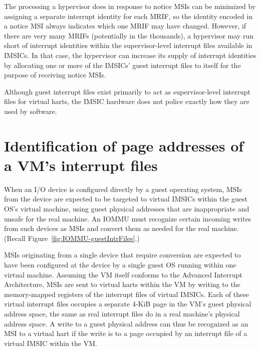 The processing a hypervisor does in response to notice MSIs can be
minimized by assigning a separate interrupt identity for each MRIF, so
the identity encoded in a notice MSI always indicates which one MRIF
may have changed.
However, if there are very many MRIFs (potentially in the thousands),
a hypervisor may run short of interrupt identities within the
supervisor-level interrupt files available in IMSICs.
In that case, the hypervisor can increase its supply of interrupt
identities by allocating one or more of the IMSICs' guest interrupt
files to itself for the purpose of receiving notice MSIs.

\begin{commentary}
Although guest interrupt files exist primarily to act as
supervisor-level interrupt files for virtual harts, the IMSIC hardware
does not police exactly how they are used by software.
\end{commentary}

\section{Identification of page addresses of a VM's interrupt files}
\label{sec:IOMMU-identIncomingMSIs}

When an I/O device is configured directly by a guest operating system,
MSIs from the device are expected to be targeted to virtual IMSICs
within the guest OS's virtual machine, using guest physical addresses
that are inappropriate and unsafe for the real machine.
An \mbox{IOMMU} must recognize certain incoming writes from such devices as
MSIs and convert them as needed for the real machine.
(Recall Figure~\ref{fig:IOMMU-guestIntrFiles}.)

MSIs originating from a single device that require conversion are
expected to have been configured at the device by a single guest OS
running within one {\RISCV} virtual machine.
Assuming the VM itself conforms to the Advanced Interrupt Architecture,
MSIs are sent to virtual harts within the VM by writing to the
memory-mapped registers of the interrupt files of virtual IMSICs.
Each of these virtual interrupt files occupies a separate \mbox{4-KiB}
page in the VM's guest physical address space, the same as real
interrupt files do in a real machine's physical address space.
A write to a guest physical address can thus be recognized as an MSI to
a virtual hart if the write is to a page occupied by an interrupt file
of a virtual IMSIC within the VM.

